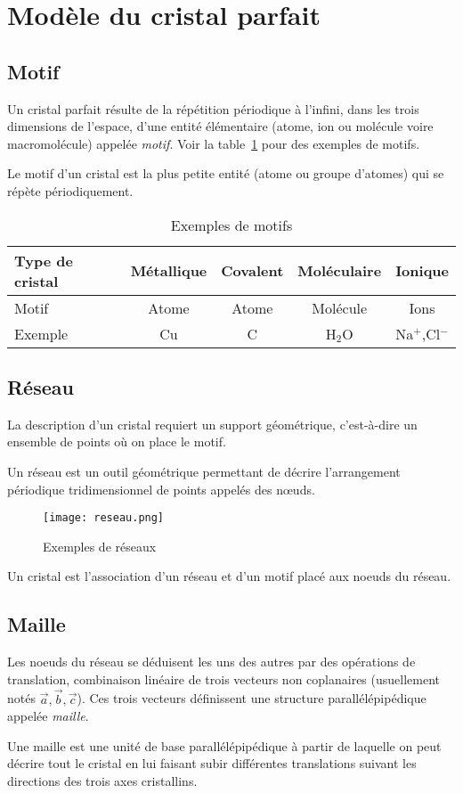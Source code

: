 \section{Modèle du cristal parfait}
\subsection{Motif}
Un cristal parfait résulte de la répétition périodique à l’infini, dans
les trois dimensions de l’espace, d’une entité élémentaire (atome, ion
ou molécule voire macromolécule) appelée \emph{motif}. Voir la
table~\ref{tab:1_motifs_ex} pour des exemples de motifs.
\begin{defi}
    Le motif d'un cristal est la plus petite entité (atome ou groupe d'atomes)
    qui se répète périodiquement.
\end{defi}
\begin{table}
    \centering
    \begin{tabular}{|l|c|c|c|c|}
        \hline Type de cristal & Métallique & Covalent & Moléculaire
        & Ionique \\
        \hline Motif & Atome & Atome & Molécule & Ions \\
        Exemple & Cu & C & H$_2$O & Na$^+$,Cl$^-$ \\ \hline
    \end{tabular}
    \caption{Exemples de motifs}\label{tab:1_motifs_ex}
\end{table}

\subsection{Réseau}
La description d'un cristal requiert un support géométrique, c’est-à-dire un 
ensemble de points où on place le motif.
\begin{defi}
    Un réseau est un outil géométrique permettant de décrire l’arrangement
    périodique tridimensionnel de points appelés des nœuds.
\end{defi}
\begin{figure}
    \centering
    \texttt{[image: reseau.png]}
    \caption{Exemples de réseaux}
\end{figure}
Un cristal est l'association d'un réseau et d'un motif placé aux noeuds du
réseau.

\subsection{Maille}
Les noeuds du réseau se déduisent les uns des autres par des opérations
de translation, combinaison linéaire de trois vecteurs non coplanaires
(usuellement notés $\vec{a}, \vec{b}, \vec{c}$). Ces
trois vecteurs définissent une structure parallélépipédique appelée
\emph{maille}.
\begin{defi}
    Une maille est une unité de base parallélépipédique à partir de laquelle
    on peut décrire tout le cristal en lui faisant subir différentes
    translations suivant les directions des trois axes cristallins.
\end{defi}

